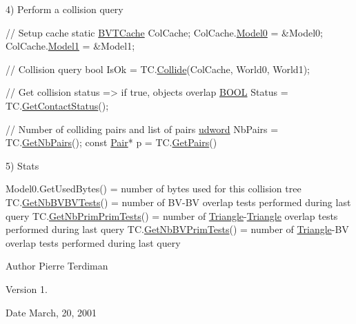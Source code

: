 4) Perform a collision query


\begin{DoxyCode}
\textcolor{comment}{// Setup cache}
\textcolor{keyword}{static} \hyperlink{structBVTCache}{BVTCache} ColCache;
ColCache.\hyperlink{structBVTCache_a69f8d5a7613435e6c58a6816ecd15e0a}{Model0} = &Model0;
ColCache.\hyperlink{structBVTCache_a092159126dbd147d9488f881e675fea0}{Model1} = &Model1;

\textcolor{comment}{// Collision query}
\textcolor{keywordtype}{bool} IsOk = TC.\hyperlink{classAABBTreeCollider_a2e7e3213e9d863cc88c10efc808708ba}{Collide}(ColCache, World0, World1);

\textcolor{comment}{// Get collision status => if true, objects overlap}
\hyperlink{IceTypes_8h_a050c65e107f0c828f856a231f4b4e788}{BOOL} Status = TC.\hyperlink{classCollider_a64a73882d4f167a6175658f014868f66}{GetContactStatus}();

\textcolor{comment}{// Number of colliding pairs and list of pairs}
\hyperlink{IceTypes_8h_a44c6f1920ba5551225fb534f9d1a1733}{udword} NbPairs = TC.\hyperlink{classAABBTreeCollider_a8b070ba9da290af5bbc187298870f00b}{GetNbPairs}();
\textcolor{keyword}{const} \hyperlink{structPair}{Pair}* p = TC.\hyperlink{classAABBTreeCollider_a1a65b30029d7d0b3e9a4dfe204b3e660}{GetPairs}()
\end{DoxyCode}


5) Stats


\begin{DoxyCode}
Model0.GetUsedBytes()   = number of bytes used \textcolor{keywordflow}{for} \textcolor{keyword}{this} collision tree
TC.\hyperlink{classAABBTreeCollider_a23f2a701706c6c900d64bc44105a828e}{GetNbBVBVTests}()     = number of BV-BV overlap tests performed during last query
TC.\hyperlink{classAABBTreeCollider_a11b71bcccec8a69ab8332f7f268caab7}{GetNbPrimPrimTests}() = number of \hyperlink{classTriangle}{Triangle}-\hyperlink{classTriangle}{Triangle} overlap tests 
      performed during last query
TC.\hyperlink{classAABBTreeCollider_a46918d4c878c578c37f7ac5c6c96cd09}{GetNbBVPrimTests}()   = number of \hyperlink{classTriangle}{Triangle}-BV overlap tests performed during last
       query
\end{DoxyCode}


\begin{DoxyAuthor}{Author}
Pierre Terdiman 
\end{DoxyAuthor}
\begin{DoxyVersion}{Version}
1. 
\end{DoxyVersion}
\begin{DoxyDate}{Date}
March, 20, 2001 
\end{DoxyDate}


